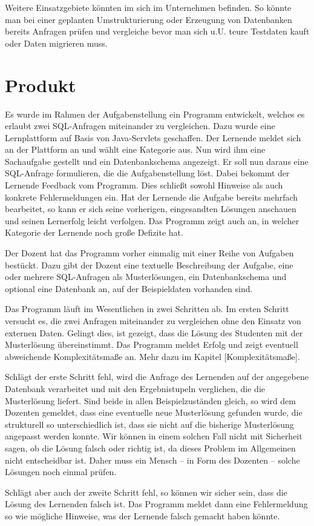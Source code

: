 Weitere Einsatzgebiete könnten im sich im Unternehmen befinden. So könnte man bei einer geplanten Umstrukturierung oder Erzeugung von Datenbanken bereits Anfragen prüfen und vergleiche bevor man sich u.U. teure Testdaten kauft oder Daten migrieren muss.


\section{Produkt}

Es wurde im Rahmen der Aufgabenstellung ein Programm entwickelt, welches es erlaubt zwei SQL-Anfragen miteinander zu vergleichen. Dazu wurde eine Lernplattform auf Basis von Java-Servlets geschaffen. Der Lernende meldet sich an der Plattform an und wählt eine Kategorie aus. Nun wird ihm eine Sachaufgabe gestellt und ein Datenbankschema angezeigt. Er soll nun daraus eine SQL-Anfrage formulieren, die die Aufgabenstellung löst. Dabei bekommt der Lernende Feedback vom Programm. Dies schließt sowohl Hinweise als auch konkrete Fehlermeldungen ein. Hat der Lernende die Aufgabe bereits mehrfach bearbeitet, so kann er sich seine vorherigen, eingesandten Lösungen anschauen und seinen Lernerfolg leicht verfolgen. Das Programm zeigt auch an, in welcher Kategorie der Lernende noch große Defizite hat.

Der Dozent hat das Programm vorher einmalig mit einer Reihe von Aufgaben bestückt. Dazu gibt der Dozent eine textuelle Beschreibung der Aufgabe, eine oder mehrere SQL-Anfragen als Musterlösungen, ein Datenbankschema und optional eine Datenbank an, auf der Beispieldaten vorhanden sind. 

Das Programm läuft im Wesentlichen in zwei Schritten ab. Im ersten Schritt versucht es, die zwei Anfragen miteinander zu vergleichen ohne den Einsatz von externen Daten. Gelingt dies, ist gezeigt, dass die Lösung des Studenten mit der Musterlösung übereinstimmt. Das Programm meldet Erfolg und zeigt eventuell abweichende Komplexitätsmaße an. Mehr dazu im Kapitel [Komplexitätsmaße].

Schlägt der erste Schritt fehl, wird die Anfrage des Lernenden auf der angegebene Datenbank verarbeitet und mit den Ergebnistupeln verglichen, die die Musterlösung liefert. Sind beide in allen Beispielzuständen gleich, so wird dem Dozenten gemeldet, dass eine eventuelle neue Musterlösung gefunden wurde, die strukturell so unterschiedlich ist, dass sie nicht auf die bisherige Musterlösung angepasst werden konnte. Wir können in einem solchen Fall nicht mit Sicherheit sagen, ob die Lösung falsch oder richtig ist, da dieses Problem im Allgemeinen nicht entscheidbar ist. Daher muss ein Mensch -- in Form des Dozenten -- solche Lösungen noch einmal prüfen.

Schlägt aber auch der zweite Schritt fehl, so können wir sicher sein, dass die Lösung des Lernenden falsch ist. Das Programm meldet dann eine Fehlermeldung so wie mögliche Hinweise, was der Lernende falsch gemacht haben könnte.



